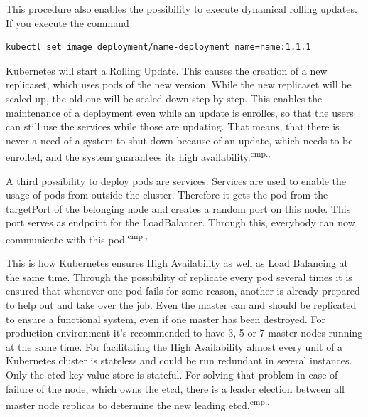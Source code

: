 This procedure also enables the possibility to execute dynamical rolling updates. If you execute the command
\begin{lstlisting}[caption={Create Kubernetes deployment},captionpos=b]
kubectl set image deployment/name-deployment name=name:1.1.1
\end{lstlisting}
Kubernetes will start a Rolling Update. This causes the creation of a new replicaset, which uses pods of the new version. While the new replicaset will be scaled up, the old one will be scaled down step by step. This enables the maintenance of a deployment even while an update is enrolles, so that the users can still use the services while those are updating. That means, that there is never a need of a system to shut down because of an update, which needs to be enrolled, and the system guarantees its high availability.\textsuperscript{cmp.\cite{13}, \cite{18}}

A third possibility to deploy pods are services. Services are used to enable the usage of pods from outside the cluster. Therefore it gets the pod from the targetPort of the belonging node and creates a random port on this node. This port serves as endpoint for the LoadBalancer. Through this, everybody can now communicate with this pod.\textsuperscript{cmp.\cite{13}, \cite{18}}

This is how Kubernetes ensures High Availability as well as Load Balancing at the same time. Through the possibility of replicate every pod several times it is ensured that whenever one pod fails for some reason, another is already prepared to help out and take over the job. Even the master can and should be replicated to ensure a functional system, even if one master has been destroyed. For production environment it's recommended to have 3, 5 or 7 master nodes running at the same time. For facilitating the High Availability almost every unit of a Kubernetes cluster is stateless and could be run redundant in several instances. Only the etcd key value store is stateful. For solving that problem in case of failure of the node, which owns the etcd, there is a leader election between all master node replicas to determine the new leading etcd.\textsuperscript{cmp.\cite{13}, \cite{18}}


